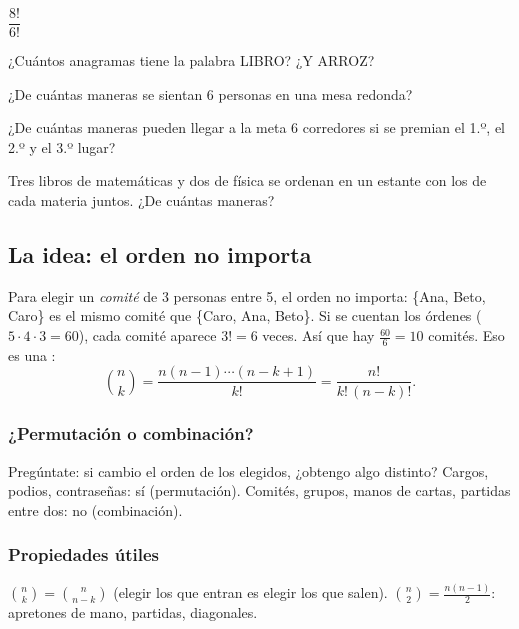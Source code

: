 \taller
{}
\begin{ejercicios}
\item $\dfrac{8!}{6!}$ 
\item ¿Cuántos anagramas tiene la palabra LIBRO? ¿Y ARROZ? 
\item ¿De cuántas maneras se sientan 6 personas en una mesa redonda? 
\end{ejercicios}
\begin{ejercicios}
\item ¿De cuántas maneras pueden llegar a la meta 6 corredores si se premian el 1.º, el 2.º y el 3.º lugar?
\item Tres libros de matemáticas y dos de física se ordenan en un estante con los de cada materia juntos. ¿De cuántas maneras?
\end{ejercicios}

\bitacora


\subsection{La idea: el orden no importa}
Para elegir un \emph{comité} de 3 personas entre 5, el orden no importa: \{Ana, Beto, Caro\} es el mismo comité que
\{Caro, Ana, Beto\}. Si se cuentan los órdenes ($5 \cdot 4 \cdot 3 = 60$), cada comité aparece $3! = 6$ veces. Así que hay
$\tfrac{60}{6} = 10$ comités. Eso es una :
\[\binom{n}{k} = \frac{n(n - 1)\cdots(n - k + 1)}{k!} = \frac{n!}{k!\,(n - k)!}.\]

\subsubsection{¿Permutación o combinación?}
Pregúntate: si cambio el orden de los elegidos, ¿obtengo algo distinto? Cargos, podios, contraseñas: sí (permutación).
Comités, grupos, manos de cartas, partidas entre dos: no (combinación).

\subsubsection{Propiedades útiles}
$\binom{n}{k} = \binom{n}{n - k}$ (elegir los que entran es elegir los que salen). $\binom{n}{2} = \tfrac{n(n-1)}{2}$:
apretones de mano, partidas, diagonales.

